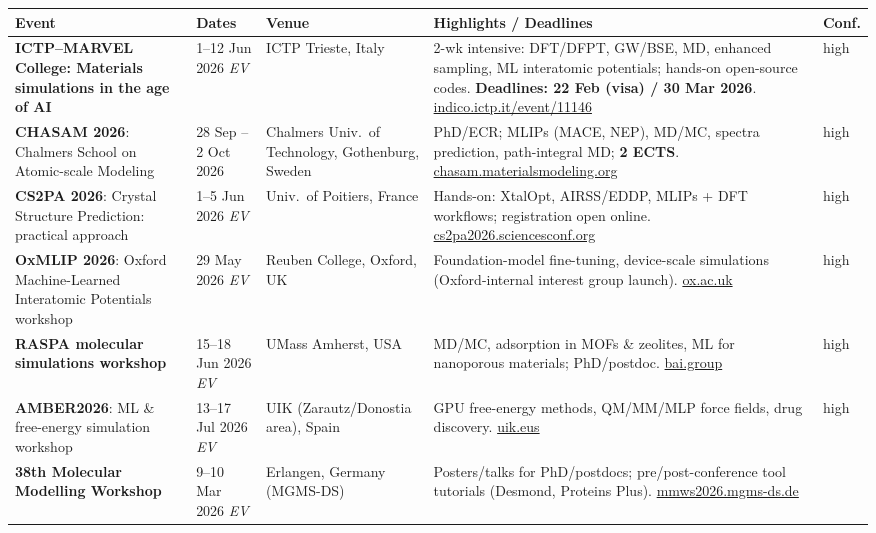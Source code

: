 \documentclass[11pt,a4paper]{article}
\newcommand{\ev}{\emph{EV}}
\begin{document}
\begin{longtable}{@{}p{3.2cm}p{3.0cm}p{2.5cm}p{5.2cm}p{1.6cm}@{}}
\toprule
\textbf{Event} & \textbf{Dates} & \textbf{Venue} & \textbf{Highlights / Deadlines} & \textbf{Conf.} \\
\midrule
\endhead
\textbf{ICTP--MARVEL College: Materials simulations in the age of AI}
  & 1--12 Jun 2026 \ev{}
  & ICTP Trieste, Italy
  & 2-wk intensive: DFT/DFPT, GW/BSE, MD, enhanced sampling, ML interatomic potentials; hands-on open-source codes. \textbf{Deadlines: 22 Feb (visa) / 30 Mar 2026}. \href{https://indico.ictp.it/event/11146/overview}{indico.ictp.it/event/11146}
  & high \\
\midrule
\textbf{CHASAM 2026}: Chalmers School on Atomic-scale Modeling
  & 28 Sep -- 2 Oct 2026
  & Chalmers Univ.\ of Technology, Gothenburg, Sweden
  & PhD/ECR; MLIPs (MACE, NEP), MD/MC, spectra prediction, path-integral MD; \textbf{2 ECTS}. \href{https://chasam.materialsmodeling.org/}{chasam.materialsmodeling.org}
  & high \\
\midrule
\textbf{CS2PA 2026}: Crystal Structure Prediction: practical approach
  & 1--5 Jun 2026 \ev{}
  & Univ.\ of Poitiers, France
  & Hands-on: XtalOpt, AIRSS/EDDP, MLIPs + DFT workflows; registration open online. \href{https://cs2pa2026.sciencesconf.org/}{cs2pa2026.sciencesconf.org}
  & high \\
\midrule
\textbf{OxMLIP 2026}: Oxford Machine-Learned Interatomic Potentials workshop
  & 29 May 2026 \ev{}
  & Reuben College, Oxford, UK
  & Foundation-model fine-tuning, device-scale simulations (Oxford-internal interest group launch). \href{https://www.advancedmaterials.ox.ac.uk/article/save-date-29-may-2026-oxmlip-workshop}{ox.ac.uk}
  & high \\
\midrule
\textbf{RASPA molecular simulations workshop}
  & 15--18 Jun 2026 \ev{}
  & UMass Amherst, USA
  & MD/MC, adsorption in MOFs \& zeolites, ML for nanoporous materials; PhD/postdoc. \href{https://bai.group/blog/raspa-workshop-2026/}{bai.group}
  & high \\
\midrule
\textbf{AMBER2026}: ML \& free-energy simulation workshop
  & 13--17 Jul 2026 \ev{}
  & UIK (Zarautz/Donostia area), Spain
  & GPU free-energy methods, QM/MM/MLP force fields, drug discovery. \href{https://www.uik.eus/en/activity/amber-machine-learning-free-energy-simulation-workshop-amber2026}{uik.eus}
  & high \\
\midrule
\textbf{38th Molecular Modelling Workshop}
  & 9--10 Mar 2026 \ev{}
  & Erlangen, Germany (MGMS-DS)
  & Posters/talks for PhD/postdocs; pre/post-conference tool tutorials (Desmond, Proteins Plus). \href{https://mmws2026.mgms-ds.de/}{mmws2026.mgms-ds.de}

\end{longtable}
\end{document}
